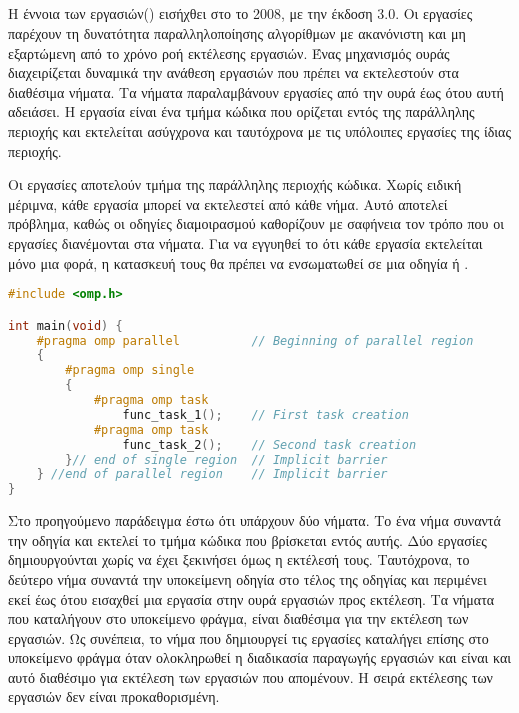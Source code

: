\clearpage
\subsection{}
Η έννοια των εργασιών(\textbf{}) εισήχθει στο \emph{} το 2008, με την έκδοση
3.0\cite{parallel_dist}. Οι εργασίες παρέχουν τη δυνατότητα παραλληλοποίησης αλγορίθμων με ακανόνιστη και μη εξαρτώμενη
από το χρόνο ροή εκτέλεσης εργασιών. Ένας μηχανισμός ουράς διαχειρίζεται δυναμικά την ανάθεση εργασιών που πρέπει να εκτελεστούν στα διαθέσιμα νήματα. Τα νήματα παραλαμβάνουν εργασίες από την ουρά έως ότου αυτή αδειάσει. Η εργασία είναι ένα
τμήμα κώδικα που ορίζεται εντός της παράλληλης περιοχής και εκτελείται ασύγχρονα και ταυτόχρονα με τις υπόλοιπες εργασίες της ίδιας περιοχής. 

Οι εργασίες αποτελούν τμήμα της παράλληλης περιοχής κώδικα. Χωρίς ειδική μέριμνα, κάθε εργασία μπορεί να
εκτελεστεί από κάθε νήμα. Αυτό αποτελεί πρόβλημα, καθώς οι οδηγίες διαμοιρασμού καθορίζουν με σαφήνεια
τον τρόπο που οι εργασίες διανέμονται στα νήματα. Για να εγγυηθεί το \emph{} ότι κάθε εργασία εκτελείται
μόνο μια φορά, η κατασκευή τους θα πρέπει να ενσωματωθεί σε μια οδηγία \emph{} ή \emph{}.
\begin{lstlisting}[tabsize=4, basicstyle=\small, language=C++, caption={\el{Χρήση εργασιών}}, frame=tb]
#include <omp.h>

int main(void) {	
	#pragma omp parallel          // Beginning of parallel region
	{
		#pragma omp single
		{
			#pragma omp task
				func_task_1();    // First task creation
			#pragma omp task
				func_task_2();    // Second task creation
		}// end of single region  // Implicit barrier
	} //end of parallel region    // Implicit barrier
}
\end{lstlisting}
\clearpage

\mbox{}
Στο προηγούμενο παράδειγμα έστω ότι υπάρχουν δύο νήματα. Το ένα νήμα συναντά την οδηγία \emph{} και εκτελεί το τμήμα κώδικα που βρίσκεται εντός αυτής. Δύο εργασίες δημιουργούνται χωρίς
να έχει ξεκινήσει όμως η εκτέλεσή τους. Ταυτόχρονα, το δεύτερο νήμα συναντά την υποκείμενη οδηγία \emph{}
στο τέλος της οδηγίας \emph{} και περιμένει εκεί έως ότου εισαχθεί μια εργασία στην ουρά εργασιών προς
εκτέλεση. Τα νήματα που καταλήγουν στο υποκείμενο φράγμα, είναι διαθέσιμα για την εκτέλεση των εργασιών. Ως συνέπεια, το νήμα που δημιουργεί τις εργασίες
καταλήγει επίσης στο υποκείμενο φράγμα όταν ολοκληρωθεί η διαδικασία παραγωγής εργασιών και είναι και αυτό διαθέσιμο
για εκτέλεση των εργασιών που απομένουν. Η σειρά εκτέλεσης των εργασιών δεν είναι προκαθορισμένη.
